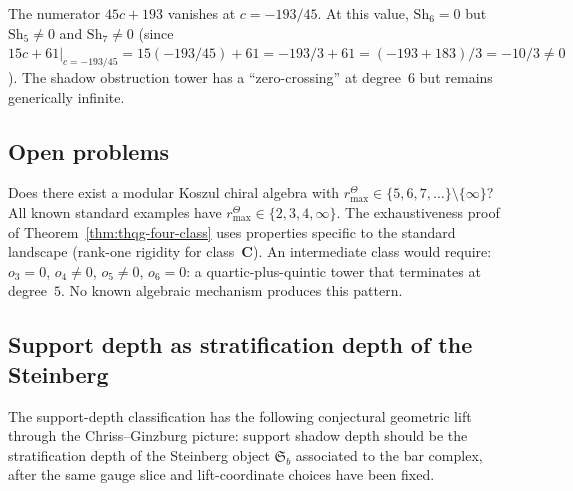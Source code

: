 \begin{computation}
The numerator $45c + 193$ vanishes at $c = -193/45$. At this
value, $\mathrm{Sh}_6 = 0$ but $\mathrm{Sh}_5 \neq 0$ and
$\mathrm{Sh}_7 \neq 0$ (since $15c + 61|_{c=-193/45} =
15(-193/45) + 61 = -193/3 + 61 = (-193 + 183)/3 = -10/3 \neq 0$).
The shadow obstruction tower has a ``zero-crossing'' at degree~$6$ but remains
generically infinite.
\end{computation}



\subsection{Open problems}

\begin{openproblem}
\label{open:thqg-gap}
Does there exist a modular Koszul chiral algebra with
\(r^\Theta_{\max}\in \{5,6,7,\ldots\}\setminus\{\infty\}\)?
All known standard examples have
\(r^\Theta_{\max}\in\{2,3,4,\infty\}\).
The exhaustiveness proof of
Theorem~\ref{thm:thqg-four-class} uses properties specific
to the standard landscape (rank-one rigidity for
class~$\mathbf{C}$). An intermediate class would require:
$o_3 = 0$, $o_4 \neq 0$, $o_5 \neq 0$, $o_6 = 0$: a
quartic-plus-quintic tower that terminates at degree~$5$.
No known algebraic mechanism produces this pattern.
\end{openproblem}


\subsection{Support depth as stratification depth of the Steinberg}

The support-depth classification has the following conjectural
geometric lift through the Chriss--Ginzburg picture: support
shadow depth should be the stratification depth of the Steinberg
object $\mathfrak{S}_b$ associated to the bar complex, after the
same gauge slice and lift-coordinate choices have been fixed.

